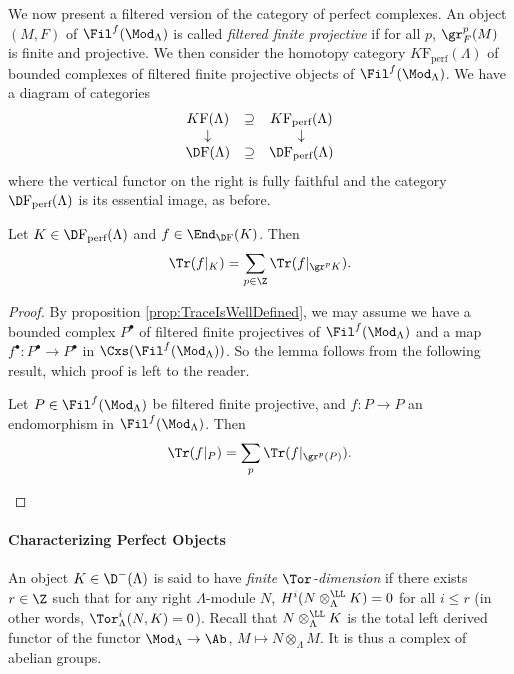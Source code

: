 We now present a filtered version of the category of perfect complexes. An object $(M,F)$ of $\Fil^f(\Mod_\Lambda)$ is called \emph{filtered finite projective} if for all $p$, $\gr^p_F (M)$ is finite and projective. We then consider the homotopy category $K\mathrm{F}_{\text{perf}}(\Lambda)$ of bounded complexes of filtered finite projective objects of $\Fil^f(\Mod_\Lambda)$. We have a diagram of categories
$$
\begin{array}{ccccc}
K\mathrm{F}(\Lambda) & \supseteq & K\mathrm{F}_{\text{perf}}(\Lambda)\\
\downarrow & & \downarrow\\
\D\mathrm{F}(\Lambda)  & \supseteq & \D\mathrm{F}_{\text{perf}}(\Lambda)
\end{array}
$$
where the vertical functor on the right is fully faithful and the category $\D\mathrm{F}_{\text{perf}}(\Lambda)$ is its essential image, as before.

\begin{lem}[Additivity] 
Let $K\in \D\mathrm{F}_{\text{perf}}(\Lambda)$ and $f\in \End_{\D\mathrm{F}}(K)$. Then 
$$
\Tr(f|_K) = \sum_{p\in \Z} \Tr(f|_{\gr^p K}).
$$
\end{lem}

\begin{proof} 
By proposition \ref{prop:TraceIsWellDefined}, we may assume we have a bounded complex $P^\bullet$ of filtered finite projectives of $\Fil^f(\Mod_\Lambda)$ and a map $f^\bullet: P^\bullet\to P^\bullet$ in $\Cxs(\Fil^f(\Mod_\Lambda))$. So the lemma follows from the following result, which proof is left to the reader.

\begin{lem}
Let $P \in \Fil^f(\Mod_\Lambda)$ be filtered finite projective, and $f: P \to P$ an endomorphism in $\Fil^f(\Mod_\Lambda)$. Then
$$
\Tr(f|_P) = \sum_p \Tr(f|_{\gr^p(P)}).
$$
\end{lem}
\end{proof}

\paragraph{Characterizing Perfect Objects} 

\begin{defi}
An object $K\in \D^-(\Lambda)$ is said to have \emph{finite $\Tor$-dimension} if there exists $r\in \Z$ such that for any right $\Lambda$-module $N$, $H^i(N\otimes_{\Lambda}^\LL K) = 0$ for all $i \leqslant r$ (in other words, $\Tor^i_\Lambda (N, K) = 0$). Recall that $N\otimes^\LL_{\Lambda}K$ is the total left derived functor of the functor $\Mod_{\Lambda} \to \Ab$, $M \mapsto N\otimes_{\Lambda} M$. It is thus a complex of abelian groups. 
\end{defi}

